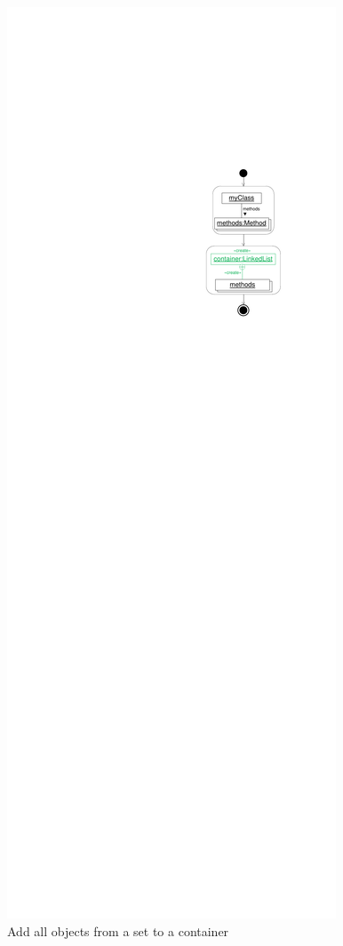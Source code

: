 \begin{figure}[p]
\begin{minipage}{.45\textwidth}
  	\label{fig:reuseObjSet2}
	\end{minipage}
  \hfill
  \begin{minipage}{.45\textwidth}
  	\centering
		\includegraphics[scale=.8]{figures/ReuseObjectSet3}
  	\caption{Add all objects from a set to a container}
  	\label{fig:reuseObjSet3}
	\end{minipage}
\end{figure}

